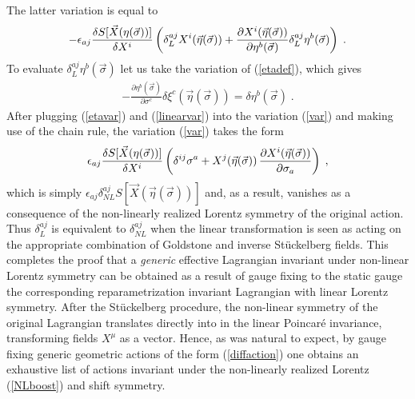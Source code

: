 \documentclass[%
 reprint,
 amsmath,amssymb,
 aps,
]{revtex4-1}
\begin{document}
The latter variation is equal to
\begin{gather}
\label{var}
-\epsilon_{a j} {\delta S[\vec{X}(\eta(\vec{\sigma}))]\over \delta X^i}
\left(\delta^{a j}_L X^i(\vec{\eta}(\vec{\sigma})) +
    \frac{\partial X^i (\vec{\eta}(\vec{\sigma}))}{\partial \eta^b(\vec{\sigma})}
    \delta^{a j}_L \eta^b(\vec{\sigma})\right) \; .
\end{gather}
To evaluate $\delta^{a j}_L \eta^b(\vec{\sigma})$ let us take the variation of (\ref{etadef}), which gives
\begin{eqnarray}
\label{etavar}
    - \frac{\partial \eta^b (\vec{\sigma})}{\partial \sigma^c} \delta \xi^c (\vec{\eta}(\vec{\sigma}))
    = \delta \eta^b(\vec{\sigma}) \; .
\end{eqnarray}
After plugging (\ref{etavar}) and (\ref{linearvar}) into the variation (\ref{var}) and making use of the chain rule, the variation
(\ref{var}) takes the form
\begin{eqnarray}
   \epsilon_{a j} {\delta S[\vec{X}(\eta(\vec{\sigma}))]\over \delta X^i} \left( \delta^{i j} \sigma^a + X^j(\vec{\eta}(\vec{\sigma})) \,
    \frac{\partial X^i(\vec{\eta}(\vec{\sigma}))}{\partial \sigma_a} \right) \; ,
    \nonumber
\end{eqnarray}
which is simply $ \epsilon_{a j} \delta^{a j}_{NL} S \left[ \vec{X}(\vec{\eta}(\vec{\sigma}) )\right]$ and, as a result, vanishes as a consequence of
the non-linearly realized Lorentz symmetry of the original action.
Thus $\delta^{a j}_L$ is equivalent to $\delta^{a j}_{NL}$ when the linear transformation
is seen as acting on the appropriate combination of Goldstone and inverse
St\"uckelberg fields.
This completes the proof that a \emph{generic} effective Lagrangian invariant under non-linear Lorentz symmetry can
be obtained as a result of gauge fixing to the static gauge the corresponding reparametrization invariant Lagrangian
with linear Lorentz symmetry. After the St\"uckelberg procedure, the non-linear symmetry of the original Lagrangian
translates directly into in the linear Poincar\'e invariance, transforming fields $X^{\mu}$ as a vector.
Hence, as was natural to expect, by gauge fixing generic geometric actions of the form (\ref{diffaction}) one obtains an exhaustive list
of actions invariant under the non-linearly realized  Lorentz (\ref{NLboost}) and shift symmetry.

\end{document}
